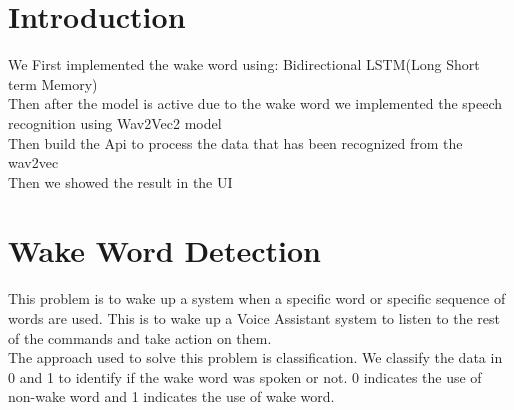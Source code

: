 \documentclass[fleqn,10pt]{SelfArx} %
\affiliation{\textsuperscript{1}\textit{MIU, Computer Science}} %
\begin{document}
\maketitle %

\tableofcontents %

\thispagestyle{empty} %


\section*{Introduction} %


We First implemented the wake word using: Bidirectional LSTM(Long Short term Memory) \\
Then after the model is active due to the wake word we implemented the speech recognition using Wav2Vec2 model \\
Then build the Api to process the data that has been recognized from the wav2vec \\
Then we showed the result in the UI




\section{Wake Word Detection}

 

This problem is to wake up a system when a specific word or specific sequence of words are used. This is to wake up a Voice Assistant system to listen to the rest of the commands and take action on them. \\
The approach used to solve this problem is classification. We classify the data in 0 and 1 to identify if the wake word was spoken or not. 0 indicates the use of non-wake word and 1 indicates the use of wake word. \\ \\
\end{document}
